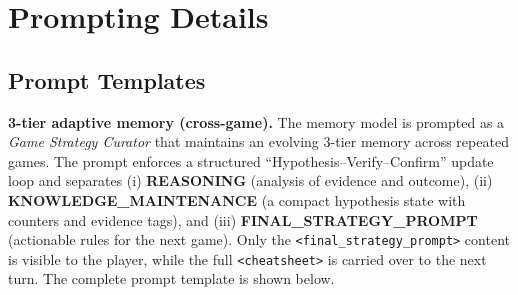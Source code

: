 \documentclass{article}
\theoremstyle{plain}
\theoremstyle{definition}
\theoremstyle{remark}
\begin{document}
\section{Prompting Details}

\subsection{Prompt Templates}\label{appendix:prompt}

\textbf{3-tier adaptive memory (cross-game).}
The memory model is prompted as a \emph{Game Strategy Curator} that maintains an evolving 3-tier memory across repeated games. The prompt enforces a structured ``Hypothesis--Verify--Confirm'' update loop and separates (i) \textbf{REASONING} (analysis of evidence and outcome), (ii) \textbf{KNOWLEDGE\_MAINTENANCE} (a compact hypothesis state with counters and evidence tags), and (iii) \textbf{FINAL\_STRATEGY\_PROMPT} (actionable rules for the next game). Only the \texttt{<final\_strategy\_prompt>} content is visible to the player, while the full \texttt{<cheatsheet>} is carried over to the next turn. The complete prompt template is shown below.
\end{document}
